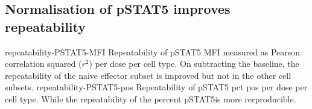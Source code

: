 \subsection{Normalisation of pSTAT5 improves repeatability}

{repeatability-PSTAT5-MFI}
{
  Repeatability of pSTAT5 MFI measured as Pearson correlation squared ($r^2$) per dose per cell type.
}
{
  On subtracting the baseline, the repeatability of the naive effector subset is improved but not in the other cell subsets.
} 
{repeatability-PSTAT5-pos}
{
  Repeatability of pSTAT5 pct pos per dose per cell type.
}
{
  While the repeatability of the percent pSTAT5\positive is more rerproducible.
}



